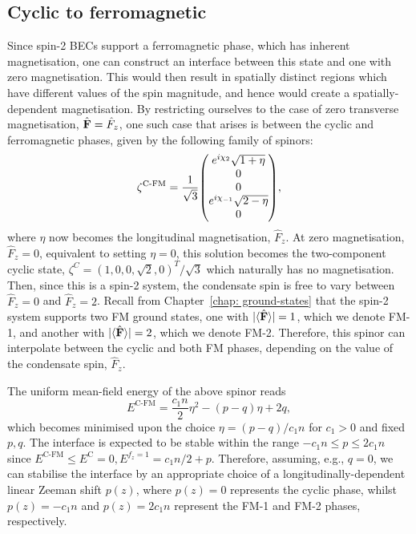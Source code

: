 \subsection{Cyclic to ferromagnetic}
Since spin-2 BECs support a ferromagnetic phase, which has inherent
magnetisation, one can construct an interface between this state and
one with zero magnetisation.
This would then result in spatially distinct regions which have different values
of the spin magnitude, and hence would create a spatially-dependent
magnetisation.
By restricting ourselves to the case of zero transverse magnetisation,
\(\hat{\vb{F}} = \hat{F}_z\), one such case that arises is between the cyclic
and ferromagnetic phases, given by the following family of spinors:
\begin{align}\label{eq: C-FM-interpolating-spinor}
    \zeta^\text{C-FM} = \frac{1}{\sqrt{3}}\mqty(
        e^{i\chi_2}\sqrt{1 + \eta} \\
        0 \\
        0 \\
        e^{i\chi_{-1}}\sqrt{2 - \eta} \\
        0
    ),
\end{align}
where \(\eta \) now becomes the longitudinal magnetisation, \(\hat{F}_z\).
At zero magnetisation, \(\hat{F}_z = 0\), equivalent to setting \(\eta=0\), this
solution becomes the two-component cyclic state,
\(\zeta^C = {(1, 0, 0, \sqrt{2}, 0)}^T/\sqrt{3}\) which naturally has no
magnetisation.
Then, since this is a spin-2 system, the condensate spin is free to vary between
\(\hat{F}_z = 0\) and \(\hat{F}_z = 2\).
Recall from Chapter~\ref{chap: ground-states} that the spin-2 system supports
two FM ground states, one with \(|\langle \hat{\vb{F}} \rangle | = 1\), which we denote
FM-1, and another with \(|\langle \hat{\vb{F}} \rangle | = 2\), which we denote FM-2.
Therefore, this spinor can interpolate between the cyclic and both FM phases,
depending on the value of the condensate spin, \(\hat{F}_z\).

The uniform mean-field energy of the above spinor reads
\begin{equation}
    E^\text{C-FM} = \frac{c_1 n}{2} \eta^2 - (p-q)\eta + 2q,
\end{equation}
which becomes minimised upon the choice \(\eta = (p-q)/c_1n\) for \(c_1 > 0\)
and fixed \(p, q\).
The interface is expected to be stable within the range
\(-c_1n \leq p \leq 2c_1n\) since \(E^\text{C-FM} \leq
E^\text{C}=0, E^{f_z=1} = c_1n/2 + p\).
Therefore, assuming, e.g., \(q=0\), we can stabilise the interface by an
appropriate choice of a longitudinally-dependent linear Zeeman shift \(p(z)\),
where \(p(z) = 0\) represents the cyclic phase, whilst \(p(z) = -c_1n\) and
\(p(z) = 2c_1n\) represent the FM-1 and FM-2 phases,
respectively.

